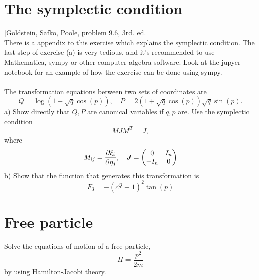 \documentclass{article}
\begin{document}
    \section{The symplectic condition}
        [Goldstein, Safko, Poole, problem 9.6, 3rd. ed.] \\
        There is a appendix to this exercise which explains the symplectic condition. The last step of exercise (a) is very tedious, and it's recommended to use Mathematica, sympy or other computer algebra software. Look at the jupyer-notebook for an example of how the exercise can be done using sympy. \\ \\
        The transformation equations between two sets of coordinates are
        \begin{equation*}
            Q = \log\left(1 + \sqrt{q} \cos(p)\right), \quad P = 2\left(1 + \sqrt{q}\cos(p)\right)\sqrt{q}\sin(p).
        \end{equation*}
        a) Show directly that $Q, P$ are canonical variables if $q, p$ are. Use the symplectic condition 
        \begin{equation*}
            M J M^T = J,
        \end{equation*}
        where 
        \begin{equation*}
            M_{ij} = \pdv{\xi_i}{\eta_j}, \quad
            J = \begin{pmatrix*}
                0 & I_n \\
                -I_n & 0 \\
            \end{pmatrix*}
        \end{equation*}
        b) Show that the function that generates this transformation is 
        \begin{equation*}
            F_3 = -(c^Q - 1)^2 \tan(p)
        \end{equation*}

    \section{Free particle}
        Solve the equations of motion of a free particle, 
        \begin{equation*}
            H = \frac{p^2}{2m}
        \end{equation*}
        by using Hamilton-Jacobi theory.
\end{document}
